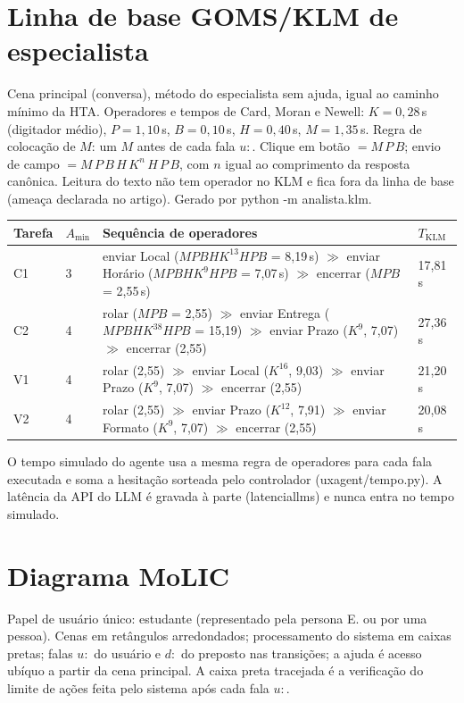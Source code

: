 \documentclass[10pt,a4paper]{article}
\newcommand{\cod}[1]{{\ttfamily\small\def\_{\textunderscore\allowbreak}#1}}
\begin{document}
\section{Linha de base GOMS/KLM de especialista}
Cena principal (\cod{conversa}), método do especialista sem ajuda, igual ao caminho mínimo da HTA. Operadores e tempos de Card, Moran e Newell: $K=0{,}28$\,s (digitador médio), $P=1{,}10$\,s, $B=0{,}10$\,s, $H=0{,}40$\,s, $M=1{,}35$\,s. Regra de colocação de $M$: um $M$ antes de cada fala $u{:}$. Clique em botão $= M\,P\,B$; envio de campo $= M\,P\,B\,H\,K^{n}\,H\,P\,B$, com $n$ igual ao comprimento da resposta canônica. Leitura do texto não tem operador no KLM e fica fora da linha de base (ameaça declarada no artigo). Gerado por \cod{python -m analista.klm}.

\begin{tabularx}{\textwidth}{@{}P{1cm}P{1.2cm}LP{1.5cm}@{}}
\toprule
Tarefa & $A_{\min}$ & Sequência de operadores & $T_{\text{KLM}}$\\
\midrule
C1 & 3 & enviar Local ($MPBHK^{13}HPB$ = 8,19\,s) $\gg$ enviar Horário ($MPBHK^{9}HPB$ = 7,07\,s) $\gg$ encerrar ($MPB$ = 2,55\,s) & 17,81\,s\\
C2 & 4 & rolar ($MPB$ = 2,55) $\gg$ enviar Entrega ($MPBHK^{38}HPB$ = 15,19) $\gg$ enviar Prazo ($K^{9}$, 7,07) $\gg$ encerrar (2,55) & 27,36\,s\\
V1 & 4 & rolar (2,55) $\gg$ enviar Local ($K^{16}$, 9,03) $\gg$ enviar Prazo ($K^{9}$, 7,07) $\gg$ encerrar (2,55) & 21,20\,s\\
V2 & 4 & rolar (2,55) $\gg$ enviar Prazo ($K^{12}$, 7,91) $\gg$ enviar Formato ($K^{9}$, 7,07) $\gg$ encerrar (2,55) & 20,08\,s\\
\bottomrule
\end{tabularx}

\medskip
O tempo simulado do agente usa a mesma regra de operadores para cada fala executada e soma a hesitação sorteada pelo controlador (\cod{uxagent/tempo.py}). A latência da API do LLM é gravada à parte (\cod{latencia\_llm\_s}) e nunca entra no tempo simulado.

\section{Diagrama MoLIC}
Papel de usuário único: estudante (representado pela persona E. ou por uma pessoa). Cenas em retângulos arredondados; processamento do sistema em caixas pretas; falas $u{:}$ do usuário e $d{:}$ do preposto nas transições; a ajuda é acesso ubíquo a partir da cena principal. A caixa preta tracejada é a verificação do limite de ações feita pelo sistema após cada fala $u{:}$.
\end{document}
